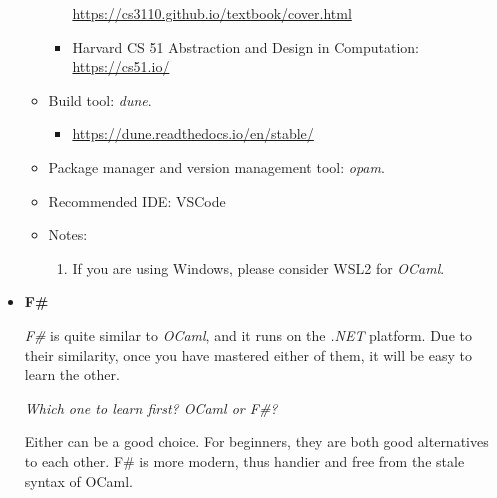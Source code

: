 \documentclass{article}
\begin{document}
\begin{itemize}
\begin{itemize}
\begin{itemize}
            \href{https://cs3110.github.io/textbook/cover.html}{https://cs3110.github.io/textbook/cover.html}
            \item Harvard CS 51
            Abstraction and Design in Computation:\\
            \href{https://cs51.io/}{https://cs51.io/}
        \end{itemize}
        \item Build tool:
        \emph{dune}.
        \begin{itemize}
            \item \href{https://dune.readthedocs.io/en/stable/}{https://dune.readthedocs.io/en/stable/}
        \end{itemize}
        \item Package manager and version management tool: \emph{opam}.
        \item Recommended IDE:
        VSCode
        \item Notes:
        \begin{enumerate}
            \item If you are using Windows, please consider WSL2 for \emph{OCaml}.
        \end{enumerate}
    \end{itemize}
    
    \item \textbf{F\#}
    
    \emph{F\#} is quite similar to \emph{OCaml}, and it runs on the \emph{.NET} platform.
    Due to their similarity, once you have mastered either of them, it will be easy to learn the other.
    
    \emph{Which one to learn first? OCaml or F\#?}
    
    Either can be a good choice. For beginners, they are both good alternatives to each other. F\# is more modern, thus handier and free from the stale syntax of OCaml.


\end{itemize}
\end{document}
